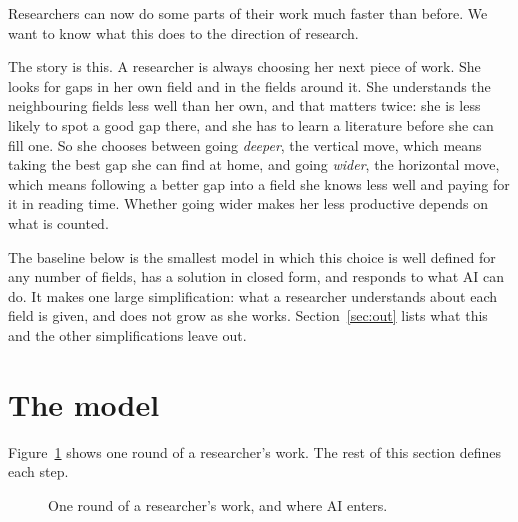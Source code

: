 \documentclass[11pt,letterpaper]{article}
\newcommand{\stepcell}[2]{\parbox[t][0.9in][t]{1.2in}{\raggedright\textbf{#1}\\[3pt]#2}}   %
\begin{document}
Researchers can now do some parts of their work much faster than before. We want to know what this does to the direction of research.

The story is this. A researcher is always choosing her next piece of work. She looks for gaps in her own field and in the fields around it. She understands the neighbouring fields less well than her own, and that matters twice: she is less likely to spot a good gap there, and she has to learn a literature before she can fill one. So she chooses between going \emph{deeper}, the vertical move, which means taking the best gap she can find at home, and going \emph{wider}, the horizontal move, which means following a better gap into a field she knows less well and paying for it in reading time. Whether going wider makes her less productive depends on what is counted.

The baseline below is the smallest model in which this choice is well defined for any number of fields, has a solution in closed form, and responds to what AI can do. It makes one large simplification: what a researcher understands about each field is given, and does not grow as she works. Section~\ref{sec:out} lists what this and the other simplifications leave out.

\section{The model}\label{sec:model}

Figure~\ref{fig:cycle} shows one round of a researcher's work. The rest of this section defines each step.

\begin{figure}[H]
\centering
{}
\caption{One round of a researcher's work, and where AI enters.}\label{fig:cycle}
\end{figure}
\end{document}

